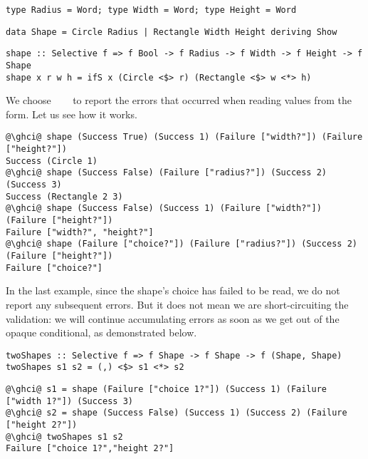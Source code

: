 {\vspace{1mm}
\begin{verbatim}
type Radius = Word; type Width = Word; type Height = Word
\end{verbatim}
\vspace{1mm}
\begin{verbatim}
data Shape = Circle Radius | Rectangle Width Height deriving Show
\end{verbatim}
\vspace{1mm}
\begin{verbatim}
shape :: Selective f => f Bool -> f Radius -> f Width -> f Height -> f Shape
shape x r w h = ifS x (Circle <$> r) (Rectangle <$> w <*> h)
\end{verbatim}
\vspace{1mm}

\noindent
We choose ~\hs{=}~~\hs{[String]} to report the errors that
occurred when reading values from the form. Let us see how it works.

\vspace{1mm}
\begin{verbatim}
@\ghci@ shape (Success True) (Success 1) (Failure ["width?"]) (Failure ["height?"])
Success (Circle 1)
@\ghci@ shape (Success False) (Failure ["radius?"]) (Success 2) (Success 3)
Success (Rectangle 2 3)
@\ghci@ shape (Success False) (Success 1) (Failure ["width?"]) (Failure ["height?"])
Failure ["width?", "height?"]
@\ghci@ shape (Failure ["choice?"]) (Failure ["radius?"]) (Success 2) (Failure ["height?"])
Failure ["choice?"]
\end{verbatim}
\vspace{1mm}

\noindent
In the last example, since the shape's choice has failed to be read, we do not
report any subsequent errors. But it does not mean we are short-circuiting the
validation: we will continue accumulating errors as soon as we get out of the
opaque conditional, as demonstrated below.

\vspace{1mm}
\begin{verbatim}
twoShapes :: Selective f => f Shape -> f Shape -> f (Shape, Shape)
twoShapes s1 s2 = (,) <$> s1 <*> s2
\end{verbatim}
\vspace{1mm}
\begin{verbatim}
@\ghci@ s1 = shape (Failure ["choice 1?"]) (Success 1) (Failure ["width 1?"]) (Success 3)
@\ghci@ s2 = shape (Success False) (Success 1) (Success 2) (Failure ["height 2?"])
@\ghci@ twoShapes s1 s2
Failure ["choice 1?","height 2?"]
\end{verbatim}
\vspace{1mm}

}

